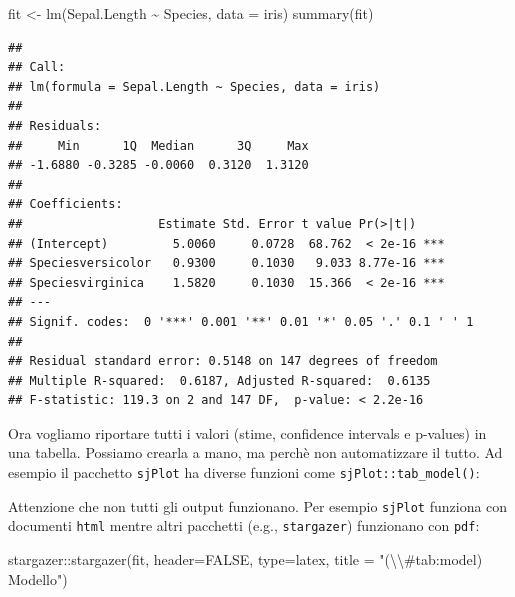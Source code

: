 \documentclass[
]{article}
\newenvironment{Shaded}{\begin{snugshade}}{\end{snugshade}}
\newcommand{\AttributeTok}[1]{\textcolor[rgb]{0.77,0.63,0.00}{#1}}
\newcommand{\ConstantTok}[1]{\textcolor[rgb]{0.00,0.00,0.00}{#1}}
\newcommand{\FunctionTok}[1]{\textcolor[rgb]{0.00,0.00,0.00}{#1}}
\newcommand{\NormalTok}[1]{#1}
\newcommand{\OtherTok}[1]{\textcolor[rgb]{0.56,0.35,0.01}{#1}}
\newcommand{\SpecialCharTok}[1]{\textcolor[rgb]{0.00,0.00,0.00}{#1}}
\newcommand{\StringTok}[1]{\textcolor[rgb]{0.31,0.60,0.02}{#1}}
\begin{document}
\begin{Shaded}
\begin{Highlighting}[]
\NormalTok{fit }\OtherTok{\textless{}{-}} \FunctionTok{lm}\NormalTok{(Sepal.Length }\SpecialCharTok{\textasciitilde{}}\NormalTok{ Species, }\AttributeTok{data =}\NormalTok{ iris)}
\FunctionTok{summary}\NormalTok{(fit)}
\end{Highlighting}
\end{Shaded}

\begin{verbatim}
## 
## Call:
## lm(formula = Sepal.Length ~ Species, data = iris)
## 
## Residuals:
##     Min      1Q  Median      3Q     Max 
## -1.6880 -0.3285 -0.0060  0.3120  1.3120 
## 
## Coefficients:
##                   Estimate Std. Error t value Pr(>|t|)    
## (Intercept)         5.0060     0.0728  68.762  < 2e-16 ***
## Speciesversicolor   0.9300     0.1030   9.033 8.77e-16 ***
## Speciesvirginica    1.5820     0.1030  15.366  < 2e-16 ***
## ---
## Signif. codes:  0 '***' 0.001 '**' 0.01 '*' 0.05 '.' 0.1 ' ' 1
## 
## Residual standard error: 0.5148 on 147 degrees of freedom
## Multiple R-squared:  0.6187, Adjusted R-squared:  0.6135 
## F-statistic: 119.3 on 2 and 147 DF,  p-value: < 2.2e-16
\end{verbatim}

Ora vogliamo riportare tutti i valori (stime, confidence intervals e p-values) in una tabella. Possiamo crearla a mano, ma perchè non automatizzare il tutto. Ad esempio il pacchetto \texttt{sjPlot} ha diverse funzioni come \texttt{sjPlot::tab\_model()}:

Attenzione che non tutti gli output funzionano. Per esempio \texttt{sjPlot} funziona con documenti \texttt{html} mentre altri pacchetti (e.g., \texttt{stargazer}) funzionano con \texttt{pdf}:

\begin{Shaded}
\begin{Highlighting}[]
\NormalTok{stargazer}\SpecialCharTok{::}\FunctionTok{stargazer}\NormalTok{(fit, }\AttributeTok{header=}\ConstantTok{FALSE}\NormalTok{, }\AttributeTok{type=}\StringTok{\textquotesingle{}latex\textquotesingle{}}\NormalTok{, }\AttributeTok{title =} \StringTok{"(}\SpecialCharTok{\textbackslash{}\textbackslash{}}\StringTok{\#tab:model) Modello"}\NormalTok{)}
\end{Highlighting}
\end{Shaded}
\end{document}

